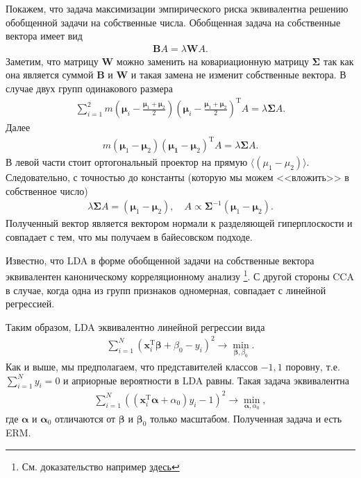 \documentclass{article}
\begin{document}
Покажем, что задача максимизации эмпирического риска эквивалентна решению обобщенной задачи на собственные числа. Обобщенная задача на собственные вектора имеет вид
\begin{align*}
    \mathbf{B}A = \lambda\mathbf{W}A.
\end{align*}
Заметим, что матрицу $\mathbf{W}$ можно заменить на ковариационную матрицу $\mathbf{\Sigma}$ так как она является суммой $\mathbf{B}$ и  $\mathbf{W}$ и такая замена не изменит собственные вектора. В случае двух групп одинакового размера
\begin{align*}
\sum_{i = 1}^2 m (\mathbf{\mu}_i - \frac{\mathbf{\mu}_1 + \mathbf{\mu}_2}{2})(\mathbf{\mu}_i - \frac{\mathbf{\mu}_1 + \mathbf{\mu}_2}{2})^\mathrm{T}A = \lambda \mathbf{\Sigma}A.
\end{align*}
Далее
\begin{align*}
 m(\mathbf{\mu}_1 - \mathbf{\mu}_2)(\mathbf{\mu_1} - \mathbf{\mu}_2)^\mathrm{T}A = \lambda \mathbf{\Sigma}A.
\end{align*}
В левой части стоит ортогональный проектор на прямую $\langle (\mu_1 - \mu_2) \rangle$. Следовательно, с точностью до константы (которую мы можем <<вложить>> в собственное число)
\begin{align*}
  \lambda\mathbf{\Sigma}A = (\mathbf{\mu}_1 - \mathbf{\mu}_2), \quad A \propto \mathbf{\Sigma}^{-1}(\mathbf{\mu}_1 - \mathbf{\mu}_2).
\end{align*}
Полученный вектор является вектором нормали к разделяющей гиперплоскости и совпадает с тем, что мы получаем в байесовском подходе.

Известно, что LDA в форме обобщенной задачи на собственные вектора эквивалентен каноническому корреляционному анализу \footnote{См. доказательство например \href{https://www.stat.washington.edu/wxs/Stat592-w2011/Slides/cancorr-notes.pdf}{здесь}}. С другой стороны CCA в случае, когда одна из групп признаков одномерная, совпадает с линейной регрессией.

Таким образом, LDA эквивалентно линейной регрессии вида
\begin{align*}
  \sum_{i = 1}^N\left(\mathbf{x}^\mathrm{T}_i\mathbf{\beta} + \beta_0-y_i\right)^2 \rightarrow \min\limits_{\mathbf{\beta},\beta_0}.
\end{align*}
Как и выше, мы предполагаем, что представителей классов ${-1, 1}$ поровну, т.е. $\sum_{i = 1}^N y_i = 0$ и априорные вероятности в LDA равны. Такая задача эквивалентна
\begin{align*}
  \sum_{i = 1}^N\left((\mathbf{x}^\mathrm{T}_i\mathbf{\alpha} + \alpha_0)y_i - 1\right)^2 \rightarrow \min\limits_{\mathbf{\alpha},\alpha_0},
\end{align*}
где $\mathbf{\alpha}$ и $\mathbf{\alpha}_0$ отличаются от $\mathbf{\beta}$ и $\mathbf{\beta}_0$ только масштабом. Полученная задача и есть ERM.
\end{document}
